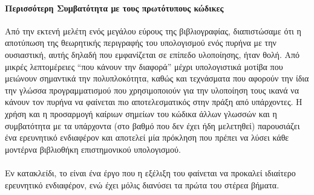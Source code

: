 \paragraph*{Περισσότερη Συμβατότητα με τους πρωτότυπους κώδικες}
Από την εκτενή μελέτη ενός μεγάλου εύρους της βιβλιογραφίας, διαπιστώσαμε ότι η αποτύπωση της θεωρητικής περιγραφής του υπολογισμού ενός πυρήνα με την ουσιαστική, αυτής δηλαδή που εμφανίζεται σε επίπεδο υλοποίησης, ήταν θολή.
Από μικρές λεπτομέρειες ``που κάνουν την διαφορά'' μέχρι υπολογιστικά μοτίβα που μειώνουν σημαντικά την πολυπλοκότητα, καθώς και τεχνάσματα που αφορούν την ίδια την γλώσσα προγραμματισμού που χρησιμοποιούν για την υλοποίηση τους ικανά να κάνουν τον πυρήνα να φαίνεται πιο αποτελεσματικός στην πράξη από υπάρχοντες.
Η χρήση και η προσαρμογή καίριων σημείων του κώδικα άλλων γλωσσών και η συμβατότητα με τα υπάρχοντα (στο βαθμό που δεν έχει ήδη μελετηθεί) παρουσιάζει ένα ερευνητικό ενδιαφέρον και αποτελεί μία πρόκληση που πρέπει να λύσει κάθε μοντέρνα βιβλιοθήκη επιστημονικού υπολογισμού.\\
\paragraph*{}Εν κατακλείδι, το  είναι ένα έργο που η εξέλιξη του φαίνεται να προκαλεί ιδιαίτερο ερευνητικό ενδιαφέρον, ενώ έχει μόλις διανύσει τα πρώτα του στέρεα βήματα.
